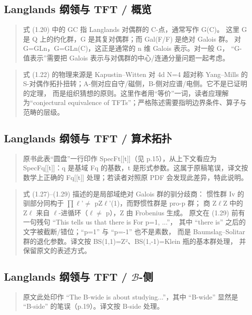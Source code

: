 \subsection*{Langlands 纲领与 TFT / 概览}
\begin{quote}\small
式 (1.20) 中的 GC 指 Langlands 对偶群的 C-点，通常写作 G(C)。 这里 G 是 Q 上的约化群，G 是其复对偶群；而 Gal(F/F) 是绝对 Galois 群。 对 G=GLn，G=GLn(C)，这正是通常的 n 维 Galois 表示。对一般 G， “G-值表示”需要把 Galois 表示与对偶群的中心/连通分量问题一起考虑。
\end{quote}

\begin{quote}\small
式 (1.22) 的物理来源是 Kapustin–Witten 对 4d N=4 超对称 Yang–Mills 的 S-对偶作拓扑扭转；A-侧对应自守/磁侧，B-侧对应谱/电侧。它不是已证明的定理， 而是组织猜想的原则。这里作者用“等价”一词，读者应理解为“conjectural equivalence of TFTs”；严格陈述需要指明边界条件、算子与范畴的层级。
\end{quote}

\subsection*{Langlands 纲领与 TFT / 算术拓扑}
\begin{quote}\small
原书此表“圆盘”一行印作 SpecFt[[t]]（见 p.15），从上下文看应为 SpecFq[[t]]：q 是基域 Fq 的基数，t 是形式参数。这属于原稿笔误，译文按数学上正确的 Fq[[t]] 处理；若读者对照原 PDF 会发现此差异，特此说明。
\end{quote}

\begin{quote}\small
式 (1.27)–(1.29) 描述的是局部域绝对 Galois 群的驯分歧商： 惯性群 Iv 的驯部分同构于 $\prod$$\ell$'$\neq$ pZ$\ell$'(1)，而野惯性群是 pro-p 群； 商 Z$\ell$Z 中的 Z$\ell$ 来自 $\ell$-进循环（$\ell$$\neq$ p），Z 由 Frobenius 生成。 原文在 (1.29) 前有一句残句 “This tells us that there is For p=1, ...”， 其中 “there is” 之后的文字被截断/错位；“p=1” 与 “p=-1” 也不是素数， 而是 Baumslag–Solitar 群的退化参数。译文按 BS(1,1)=Z²、BS(1,-1)=Klein 瓶的基本群处理， 并保留原文的表述方式。
\end{quote}

\subsection*{Langlands 纲领与 TFT / $\mathcal{B}$-侧}
\begin{quote}\small
原文此处印作 “The B-wide is about studying...”，其中 “B-wide” 显然是 “B-side” 的笔误（p.19）。译文按 B-side 处理。
\end{quote}

